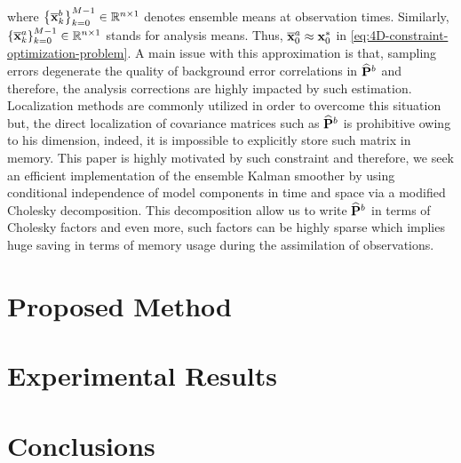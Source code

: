 where $\left \{ \overline{\bf x}^b_k \right \}_{k=0}^{M-1} \in \mathbb{R}^{n \times 1}$ denotes ensemble means at observation times. Similarly, $\left \{ \overline{\bf x}^a_k \right \}_{k=0}^{M-1} \in \mathbb{R}^{n \times 1}$ stands for analysis means. Thus, $\overline{\bf x}^a_0 \approx {\bf x}_0^{*}$ in \eqref{eq:4D-constraint-optimization-problem}. A main issue with this approximation is that, sampling errors degenerate the quality of background error correlations in $\widehat{{\bf P}}^b$ and therefore, the analysis corrections are highly impacted by such estimation. Localization methods are commonly utilized in order to overcome this situation but, the direct localization of covariance matrices such as $\widehat{{\bf P}}^b$ is prohibitive owing to his dimension, indeed, it is impossible to explicitly store such matrix in memory. This paper is highly motivated by such constraint and therefore, we seek an efficient implementation of the ensemble Kalman smoother by using conditional independence of model components in time and space via a modified Cholesky decomposition. This decomposition allow us to write $\widehat{{\bf P}}^b$ in terms of Cholesky factors and even more, such factors can be highly sparse which implies huge saving in terms of memory usage during the assimilation of observations.

\section{Proposed Method}
\label{sec:proposed-method}

\section{Experimental Results}
\label{sec:experimental-results}

\section{Conclusions}
\label{sec:conclusions}






